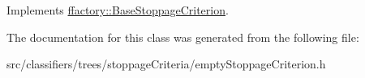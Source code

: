 Implements \hyperlink{classffactory_1_1_base_stoppage_criterion_a47728f0c9b241133e228ea5956248241}{ffactory\-::\-Base\-Stoppage\-Criterion}.



The documentation for this class was generated from the following file\-:\begin{DoxyCompactItemize}
\item 
src/classifiers/trees/stoppage\-Criteria/empty\-Stoppage\-Criterion.\-h\end{DoxyCompactItemize}
